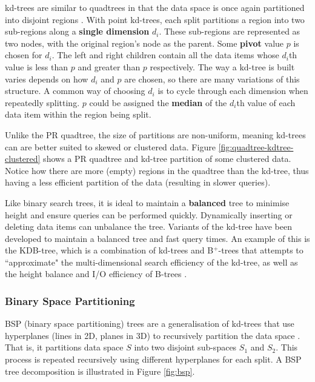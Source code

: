kd-trees are similar to quadtrees in that the data space is once again partitioned into disjoint regions \cite{kd-tree}. With point kd-trees, each split partitions a region into two sub-regions along a \textbf{single dimension} $d_i$. These sub-regions are represented as two nodes, with the original region's node as the parent. Some \textbf{pivot} value $p$ is chosen for $d_i$. The left and right children contain all the data items whose $d_i$th value is less than $p$ and greater than $p$ respectively. The way a kd-tree is built varies depends on how $d_i$ and $p$ are chosen, so there are many variations of this structure. A common way of choosing $d_i$ is to cycle through each dimension when repeatedly splitting. $p$ could be assigned the \textbf{median} of the $d_i$th value of each data item within the region being split.

Unlike the PR quadtree, the size of partitions are non-uniform, meaning kd-trees can are better suited to skewed or clustered data. Figure \ref{fig:quadtree-kdtree-clustered} shows a PR quadtree and kd-tree partition of some clustered data. Notice how there are more (empty) regions in the quadtree than the kd-tree, thus having a less efficient partition of the data (resulting in slower queries).

Like binary search trees, it is ideal to maintain a \textbf{balanced} tree to minimise height and ensure queries can be performed quickly. Dynamically inserting or deleting data items can unbalance the tree. Variants of the kd-tree have been developed to maintain a balanced tree and fast query times. An example of this is the KDB-tree, which is a combination of kd-trees and B${}^{+}$-trees that attempts to ``approximate" the multi-dimensional search efficiency of the kd-tree, as well as the height balance and I/O efficiency of B-trees \cite{kdb-tree}.

\subsubsection{Binary Space Partitioning}

BSP (binary space partitioning) trees are a generalisation of kd-trees that use hyperplanes (lines in 2D, planes in 3D) to recursively partition the data space \cite{bsp-tree}. That is, it partitions data space $S$ into two disjoint sub-spaces $S_1$ and $S_2$. This process is repeated recursively using different hyperplanes for each split. A BSP tree decomposition is illustrated in Figure \ref{fig:bsp}.

